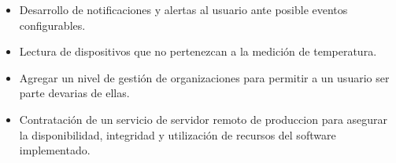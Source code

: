 \begin{itemize}
	\item Desarrollo de notificaciones y alertas al usuario ante posible eventos configurables.
	\item Lectura de dispositivos que no pertenezcan a la medición de temperatura.
	\item Agregar un nivel de gestión de organizaciones para permitir a un usuario ser parte devarias de ellas. 
	\item Contratación de un servicio de servidor remoto de produccion para asegurar la disponibilidad, integridad y utilización de recursos del software implementado.
\end{itemize}
